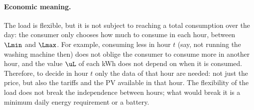\paragraph{Economic meaning.}
The load is flexible, but it is not subject to reaching a total consumption over the day:
the consumer only chooses how much to consume in each hour, between $\Lmin$ and $\Lmax$. For
example, consuming less in hour $t$ (say, not running the washing machine then) does not
oblige the consumer to consume more in another hour, and the value $\uL$ of each kWh does
not depend on when it is consumed. Therefore, to decide in hour $t$ only the data of that
hour are needed: not just the price, but also the tariffs and the PV available in that
hour. The flexibility of the load does not break the independence between hours; what would
break it is a minimum daily energy requirement or a battery.
